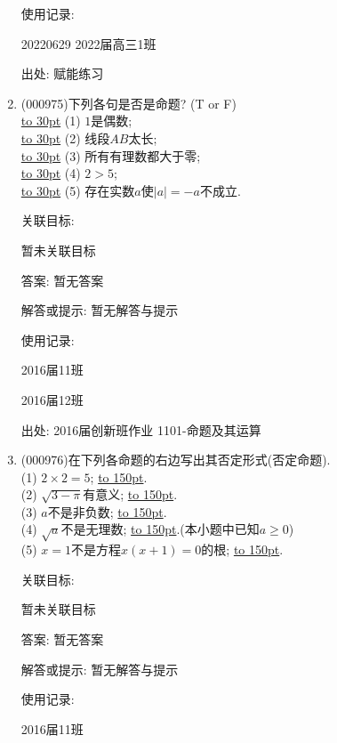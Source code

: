\documentclass[10pt,a4paper]{article}
\newcommand{\blank}[1]{\underline{\hbox to #1pt{}}}
\begin{document}
\begin{enumerate}[1.]
使用记录:

20220629    2022届高三1班  	


出处: 赋能练习
\item { (000975)}下列各句是否是命题? (T or F)\\ 
\blank{30} (1) $1$是偶数;\\ 
\blank{30} (2) 线段$AB$太长;\\ 
\blank{30} (3) 所有有理数都大于零;\\ 
\blank{30} (4) $2>5$;\\ 
\blank{30} (5) 存在实数$a$使$|a|=-a$不成立.


关联目标:

暂未关联目标

答案: 暂无答案

解答或提示: 暂无解答与提示

使用记录:

2016届11班					

2016届12班					


出处: 2016届创新班作业	1101-命题及其运算
\item { (000976)}在下列各命题的右边写出其否定形式(否定命题).\\ 
(1) $2 \times 2 =5$; \blank{150}.\\ 
(2) $\sqrt{3-\pi}$有意义; \blank{150}.\\ 
(3) $a$不是非负数; \blank{150}.\\ 
(4) $\sqrt{a}$不是无理数; \blank{150}.(本小题中已知$a\ge 0$)\\ 
(5) $x=1$不是方程$x(x+1)=0$的根; \blank{150}.


关联目标:

暂未关联目标

答案: 暂无答案

解答或提示: 暂无解答与提示

使用记录:

2016届11班					


\end{enumerate}
\end{document}
